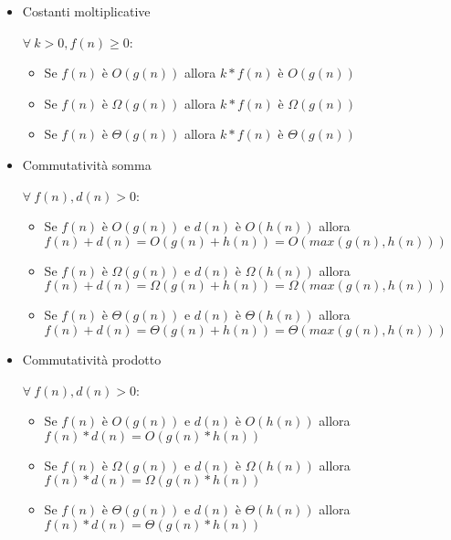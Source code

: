 \documentclass{article}
\begin{document}
\begin{itemize}
    \item Costanti moltiplicative

        $\forall\ k>0,f(n)\geq0$:
        \begin{itemize}
            \item Se $f(n)$ è $O(g(n))$ allora $k*f(n)$ è $O(g(n))$

           \item Se $f(n)$ è $\Omega(g(n))$ allora $k*f(n)$ è $\Omega(g(n))$

            \item Se $f(n)$ è $\Theta(g(n))$ allora $k*f(n)$ è $\Theta(g(n))$
                        
        \end{itemize}
    
    \item Commutatività somma

        $\forall\ f(n),d(n)>0$:
        \begin{itemize}
            \item Se $f(n)$ è $O(g(n))$ e $d(n)$ è $O(h(n))$ allora $f(n)+d(n)=O(g(n)+h(n))=O(max(g(n),h(n)))$

            \item Se $f(n)$ è $\Omega(g(n))$ e $d(n)$ è $\Omega(h(n))$ allora $f(n)+d(n)=\Omega(g(n)+h(n))=\Omega(max(g(n),h(n)))$

            \item Se $f(n)$ è $\Theta(g(n))$ e $d(n)$ è $\Theta(h(n))$ allora $f(n)+d(n)=\Theta(g(n)+h(n))=\Theta(max(g(n),h(n)))$
            
        \end{itemize}
    
    \item Commutatività prodotto

        $\forall\ f(n),d(n)>0$:
        \begin{itemize}
            \item Se $f(n)$ è $O(g(n))$ e $d(n)$ è $O(h(n))$ allora $f(n)*d(n)=O(g(n)*h(n))$

            \item Se $f(n)$ è $\Omega(g(n))$ e $d(n)$ è $\Omega(h(n))$ allora $f(n)*d(n)=\Omega(g(n)*h(n))$

            \item Se $f(n)$ è $\Theta(g(n))$ e $d(n)$ è $\Theta(h(n))$ allora $f(n)*d(n)=\Theta(g(n)*h(n))$
            
        \end{itemize}
    
\end{itemize}
\end{document}
